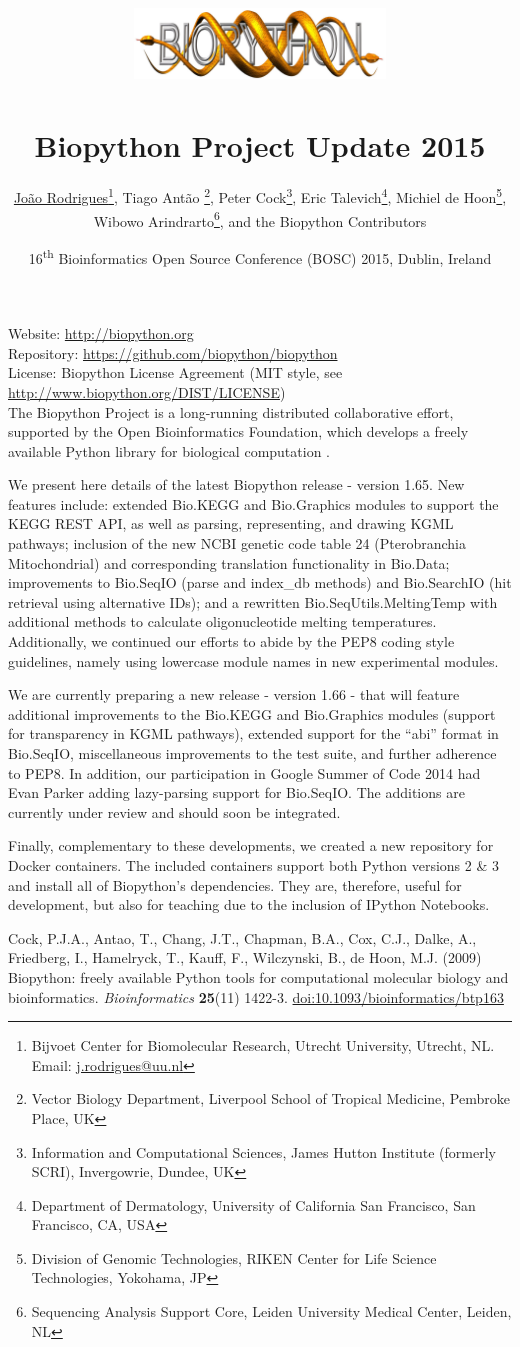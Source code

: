 \documentclass[10pt,oneside]{article}
\title{%
\vspace{-1.5in}
\includegraphics[width=0.5\textwidth]{biopython.jpg}\\
~\\Biopython Project Update 2015}
\author{
    \underline{Jo\~{a}o Rodrigues}\footnote{Bijvoet Center for Biomolecular Research, Utrecht University, Utrecht, NL. Email: \href{mailto:j.rodrigues@uu.nl}{j.rodrigues@uu.nl}},
    Tiago Ant\~{a}o \footnote{Vector Biology Department, Liverpool School of Tropical Medicine, Pembroke Place, UK},
    Peter Cock\footnote{Information and Computational Sciences, James Hutton Institute (formerly SCRI), Invergowrie, Dundee, UK},
    Eric Talevich\footnote{Department of Dermatology, University of California San Francisco, San Francisco, CA, USA},
    Michiel de Hoon\footnote{Division of Genomic Technologies, RIKEN Center for Life Science Technologies, Yokohama, JP},
		\\
    Wibowo Arindrarto\footnote{Sequencing Analysis Support Core, Leiden University Medical Center, Leiden, NL},
    and the Biopython Contributors}
\date{16\textsuperscript{th} Bioinformatics Open Source Conference (BOSC) 2015, Dublin, Ireland}
\begin{document}
\maketitle
\thispagestyle{empty}

\vspace{-0.2in}
\noindent
Website: \url{http://biopython.org} \\
Repository: \url{https://github.com/biopython/biopython} \\
License: Biopython License Agreement (MIT style, see \url{http://www.biopython.org/DIST/LICENSE}) \\

The Biopython Project is a long-running distributed collaborative effort, supported by the Open Bioinformatics Foundation, which develops a freely available Python library for biological computation \cite{AppNote}.

We present here details of the latest Biopython release - version 1.65. New features include: extended Bio.KEGG and Bio.Graphics modules to support the KEGG REST API, as well as parsing, representing, and drawing KGML pathways; inclusion of the new NCBI genetic code table 24 (Pterobranchia Mitochondrial) and corresponding translation functionality in Bio.Data; improvements to Bio.SeqIO (parse and index\_db methods) and Bio.SearchIO (hit retrieval using alternative IDs); and a rewritten Bio.SeqUtils.MeltingTemp with additional methods to calculate oligonucleotide melting temperatures. Additionally, we continued our efforts to abide by the PEP8 coding style guidelines, namely using lowercase module names in new experimental modules.

We are currently preparing a new release - version 1.66 - that will feature additional improvements to the Bio.KEGG and Bio.Graphics modules (support for transparency in KGML pathways), extended support for the ``abi'' format in Bio.SeqIO, miscellaneous improvements to the test suite, and further adherence to PEP8. In addition, our participation in Google Summer of Code 2014 had Evan Parker adding lazy-parsing support for Bio.SeqIO. The additions are currently under review and should soon be integrated.

Finally, complementary to these developments, we created a new repository for Docker containers. The included containers support both Python versions 2 \& 3 and install all of Biopython's dependencies. They are, therefore, useful for development, but also for teaching due to the inclusion of IPython Notebooks.

\begin{thebibliography}{}

Cock, P.J.A., Antao, T., Chang, J.T., Chapman, B.A., Cox, C.J., Dalke, A., Friedberg, I., Hamelryck, T., Kauff, F., Wilczynski, B., de Hoon, M.J. (2009) Biopython: freely available Python tools for computational molecular biology and bioinformatics. {\it Bioinformatics} {\bf 25}(11) 1422-3. \href{http://dx.doi.org/10.1093/bioinformatics/btp163}{doi:10.1093/bioinformatics/btp163}

\end{thebibliography}
\end{document}
